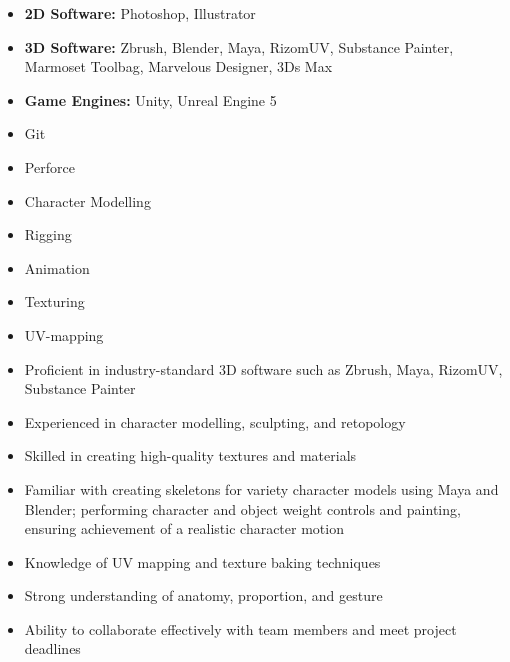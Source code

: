






\begin{itemize}
    \item \textbf{2D Software:} Photoshop, Illustrator
    \item \textbf{3D Software:} Zbrush, Blender, Maya, RizomUV, Substance Painter, Marmoset Toolbag, Marvelous Designer, 3Ds Max
    \item \textbf{Game Engines:} Unity, Unreal Engine 5 
    \item Git
    \item Perforce
    \item Character Modelling
    \item Rigging
    \item Animation
    \item Texturing
    \item UV-mapping
\end{itemize}


\begin{itemize}

\item Proficient in industry-standard 3D software such as Zbrush, Maya, RizomUV,
Substance Painter
\item Experienced in character modelling, sculpting, and retopology
\item Skilled in creating high-quality textures and materials
\item Familiar with creating skeletons for variety character models using Maya and Blender; performing character and object weight controls and painting, ensuring achievement of a realistic character motion
\item Knowledge of UV mapping and texture baking techniques
\item Strong understanding of anatomy, proportion, and gesture
\item Ability to collaborate effectively with team members and meet project deadlines

\end{itemize}


\medskip

